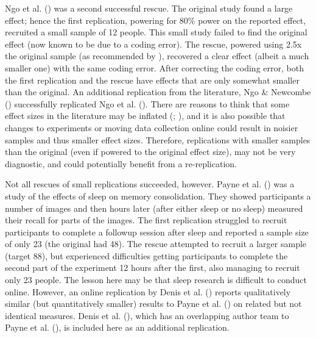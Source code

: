 \documentclass[
  english,
  a4paper,
]{article}
\begin{document}
Ngo et al. () was a second successful rescue.
The original study found a large effect; hence the first replication, powering for 80\% power on the reported effect, recruited a small sample of 12 people.
This small study failed to find the original effect (now known to be due to a coding error).
The rescue, powered using 2.5x the original sample (as recommended by ), recovered a clear effect (albeit a much smaller one) with the same coding error. After correcting the coding error, both the first replication and the rescue have effects that are only somewhat smaller than the original.
An additional replication from the literature, Ngo \& Newcombe () successfully replicated Ngo et al. ().
There are reasons to think that some effect sizes in the literature may be inflated (; ), and it is also possible that changes to experiments or moving data collection online could result in noisier samples and thus smaller effect sizes.
Therefore, replications with smaller samples than the original (even if powered to the original effect size), may not be very diagnostic, and could potentially benefit from a re-replication.

Not all rescues of small replications succeeded, however.
Payne et al. () was a study of the effects of sleep on memory consolidation.
They showed participants a number of images and then hours later (after either sleep or no sleep) measured their recall for parts of the images.
The first replication struggled to recruit participants to complete a followup session after sleep and reported a sample size of only 23 (the original had 48).
The rescue attempted to recruit a larger sample (target 88), but experienced difficulties getting participants to complete the second part of the experiment 12 hours after the first, also managing to recruit only 23 people.
The lesson here may be that sleep research is difficult to conduct online.
However, an online replication by Denis et al. () reports qualitatively similar (but quantitatively smaller) results to Payne et al. () on related but not identical measures.
Denis et al. (), which has an overlapping author team to Payne et al. (), is included here as an additional replication.
\end{document}

